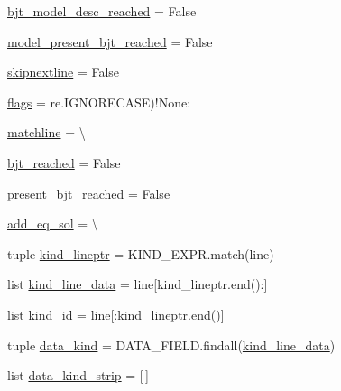 \begin{DoxyCompactItemize}
\item 
\hyperlink{classsage__circuit__analysis_1_1SmallSignalLinearCircuit_a469278fe5ac7694dd2287b50b0e2d1b9}{bjt\-\_\-model\-\_\-desc\-\_\-reached} = False
\item 
\hyperlink{classsage__circuit__analysis_1_1SmallSignalLinearCircuit_a350126ddf605351a760c4367f2061c90}{model\-\_\-present\-\_\-bjt\-\_\-reached} = False
\item 
\hyperlink{classsage__circuit__analysis_1_1SmallSignalLinearCircuit_a9fbbbc2bb3294beeecf3d6270c1996c5}{skipnextline} = False
\item 
\hyperlink{classsage__circuit__analysis_1_1SmallSignalLinearCircuit_a1c773903fae5f212ae0e23e952de482b}{flags} = re.\-I\-G\-N\-O\-R\-E\-C\-A\-S\-E)!None\-:
\item 
\hyperlink{classsage__circuit__analysis_1_1SmallSignalLinearCircuit_ab8ff2e3e2ad4f9d24fb54fb08eb69566}{matchline} = \textbackslash{}
\item 
\hyperlink{classsage__circuit__analysis_1_1SmallSignalLinearCircuit_a0a963cfd08ac31ee28bf607ffd51da46}{bjt\-\_\-reached} = False
\item 
\hyperlink{classsage__circuit__analysis_1_1SmallSignalLinearCircuit_a17a57846a93924c77174b5ec392b6b21}{present\-\_\-bjt\-\_\-reached} = False
\item 
\hyperlink{classsage__circuit__analysis_1_1SmallSignalLinearCircuit_a8b2afa223336bbdcbe708a2aca461d0c}{add\-\_\-eq\-\_\-sol} = \textbackslash{}
\item 
tuple \hyperlink{classsage__circuit__analysis_1_1SmallSignalLinearCircuit_a0c320f651aea96aa531713dd28e17752}{kind\-\_\-lineptr} = K\-I\-N\-D\-\_\-\-E\-X\-P\-R.\-match(line)
\item 
list \hyperlink{classsage__circuit__analysis_1_1SmallSignalLinearCircuit_a06d139ba1b6ae057950ca8b6620a7e6a}{kind\-\_\-line\-\_\-data} = line\mbox{[}kind\-\_\-lineptr.\-end()\-:\mbox{]}
\item 
list \hyperlink{classsage__circuit__analysis_1_1SmallSignalLinearCircuit_aa8b02260c5b339c7d6d5411c0503737f}{kind\-\_\-id} = line\mbox{[}\-:kind\-\_\-lineptr.\-end()\mbox{]}
\item 
tuple \hyperlink{classsage__circuit__analysis_1_1SmallSignalLinearCircuit_a7b99b433325d89efb35e8d97eab61600}{data\-\_\-kind} = D\-A\-T\-A\-\_\-\-F\-I\-E\-L\-D.\-findall(\hyperlink{classsage__circuit__analysis_1_1SmallSignalLinearCircuit_a06d139ba1b6ae057950ca8b6620a7e6a}{kind\-\_\-line\-\_\-data})
\item 
list \hyperlink{classsage__circuit__analysis_1_1SmallSignalLinearCircuit_a4831b9e65fbf534e51609b61d77ba5bb}{data\-\_\-kind\-\_\-strip} = \mbox{[}$\,$\mbox{]}

\end{DoxyCompactItemize}
